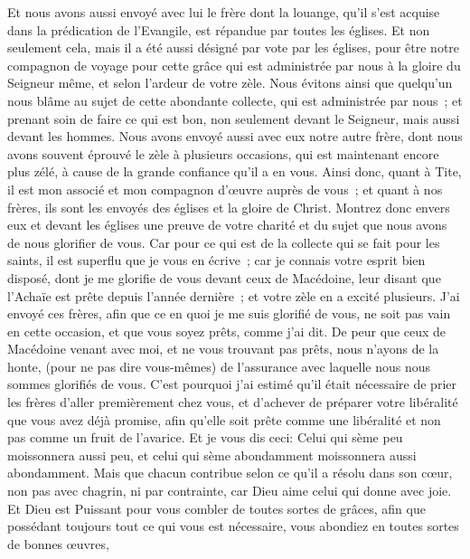 \begin{multicols}{2}
Et nous avons aussi envoyé avec lui le frère dont la louange, qu'il s'est acquise dans la prédication de l'Evangile, est répandue par toutes les églises.
Et non seulement cela, mais il a été aussi désigné par vote par les églises, pour être notre compagnon de voyage pour cette grâce qui est administrée par nous à la gloire du Seigneur même, et selon l'ardeur de votre zèle.
Nous évitons ainsi que quelqu'un nous blâme au sujet de cette abondante collecte, qui est administrée par nous~;
et prenant soin de faire ce qui est bon, non seulement devant le Seigneur, mais aussi devant les hommes.
Nous avons envoyé aussi avec eux notre autre frère, dont nous avons souvent éprouvé le zèle à plusieurs occasions, qui est maintenant encore plus zélé, à cause de la grande confiance qu'il a en vous.
Ainsi donc, quant à Tite, il est mon associé et mon compagnon d'œuvre auprès de vous~; et quant à nos frères, ils sont les envoyés des églises et la gloire de Christ.
Montrez donc envers eux et devant les églises une preuve de votre charité et du sujet que nous avons de nous glorifier de vous.
\VerseOne{}Car pour ce qui est de la collecte qui se fait pour les saints, il est superflu que je vous en écrive~;
car je connais votre esprit bien disposé, dont je me glorifie de vous devant ceux de Macédoine, leur disant que l'Achaïe est prête depuis l'année dernière~; et votre zèle en a excité plusieurs.
J'ai envoyé ces frères, afin que ce en quoi je me suis glorifié de vous, ne soit pas vain en cette occasion, et que vous soyez prêts, comme j'ai dit.
De peur que ceux de Macédoine venant avec moi, et ne vous trouvant pas prêts, nous n'ayons de la honte, (pour ne pas dire vous-mêmes) de l'assurance avec laquelle nous nous sommes glorifiés de vous.
C'est pourquoi j'ai estimé qu'il était nécessaire de prier les frères d'aller premièrement chez vous, et d'achever de préparer votre libéralité que vous avez déjà promise, afin qu'elle soit prête comme une libéralité et non pas comme un fruit de l'avarice.
Et je vous dis ceci: Celui qui sème peu moissonnera aussi peu, et celui qui sème abondamment moissonnera aussi abondamment.
Mais que chacun contribue selon ce qu'il a résolu dans son cœur, non pas avec chagrin, ni par contrainte, car Dieu aime celui qui donne avec joie.
Et Dieu est Puissant pour vous combler de toutes sortes de grâces, afin que possédant toujours tout ce qui vous est nécessaire, vous abondiez en toutes sortes de bonnes œuvres,

\end{multicols}
